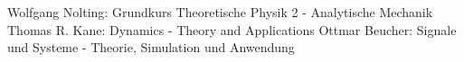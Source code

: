 \documentclass{article}
\begin{document}






\newpage
\begin{thebibliography}{\hspace{0.5cm}}
	 Wolfgang Nolting: Grundkurs Theoretische Physik 2 - Analytische Mechanik
	 Thomas R. Kane: Dynamics - Theory and Applications
	 Ottmar Beucher: Signale und Systeme - Theorie, Simulation und Anwendung

\end{thebibliography}
\end{document}
